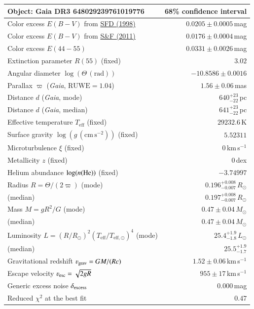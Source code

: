 \documentclass{standalone}
\begin{document}
\renewcommand{\arraystretch}{1.2}
\begin{tabular}{lr}
\hline\hline
Object: Gaia DR3 648029239761019776 & 68\% confidence interval\\
\hline
Color excess $E(B-V)$ from \href{https://ui.adsabs.harvard.edu/abs/1998ApJ...500..525S/abstract}{SFD (1998)} & $0.0205 \pm 0.0005$\,mag \\
Color excess $E(B-V)$ from \href{https://ui.adsabs.harvard.edu/abs/2011ApJ...737..103S/abstract}{S\&F (2011)} & $0.0176 \pm 0.0004$\,mag \\
\hline
Color excess $E(44-55)$ & $0.0331 \pm 0.0026$\,mag \\
Extinction parameter $R(55)$ (fixed) & $3.02$ \\
Angular diameter $\log(\Theta\,\mathrm{(rad)})$ & $-10.8586 \pm 0.0016$ \\
Parallax $\varpi$ ({\it Gaia}, $\text{RUWE}=1.04$) & $1.56 \pm 0.06$\,mas \\
Distance $d$ ({\it Gaia}, mode) & $640^{+23}_{-22}$\,pc \\
Distance $d$ ({\it Gaia}, median) & $641^{+23}_{-22}$\,pc \\
Effective temperature $T_{\mathrm{eff}}$ (fixed) & $29232.6$\,K \\
Surface gravity $\log (g\,\mathrm{(cm\,s^{-2})})$ (fixed) & $5.52311$ \\
Microturbulence $\xi$ (fixed) & $0$\,km\,s$^{-1}$ \\
Metallicity $z$ (fixed) & $0$\,dex \\
Helium abundance $\log(n(\textnormal{He}))$ (fixed) & $-3.74997$ \\
Radius $R = \Theta/(2\varpi)$ (mode) & $0.196^{+0.008}_{-0.007}$\,$R_\odot$ \\
\phantom{Radius $R = \Theta/(2\varpi)$ }(median) & $0.197^{+0.008}_{-0.007}$\,$R_\odot$ \\
Mass $M = g R^2/G$ (mode) & $0.47 \pm 0.04$\,$M_\odot$ \\
\phantom{Mass $M = g R^2/G$ }(median) & $0.47 \pm 0.04$\,$M_\odot$ \\
Luminosity $L = (R/R_\odot)^2(T_\mathrm{eff}/T_{\mathrm{eff},\odot})^4$ (mode) & $25.4^{+1.9}_{-1.8}$\,$L_\odot$ \\
\phantom{Luminosity $L/L_\odot = (R/R_\odot)^2(T_\mathrm{eff}/T_{\mathrm{eff},\odot})^4$ }(median) & $25.5^{+1.9}_{-1.7}$ \\
Gravitational redshift $\varv_\mathrm{grav} = GM/(Rc)$ & $1.52 \pm 0.06$\,km\,s${}^{-1}$ \\
Escape velocity $\varv_\mathrm{esc} = \sqrt{2gR}$ & $955 \pm 17$\,km\,s${}^{-1}$ \\
\hline
Generic excess noise $\delta_\textnormal{excess}$ & $0.000$\,mag \\
Reduced $\chi^2$ at the best fit & $0.47$ \\
\hline
\end{tabular}
\end{document}
